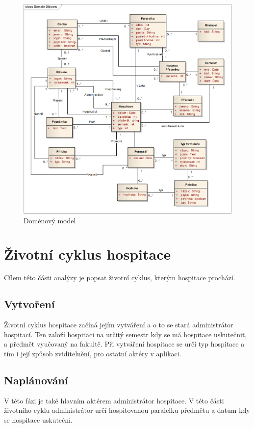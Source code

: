 \begin{figure}[p]
\begin{center}
\includegraphics[width=16cm]{figures/DomainModel}
\caption{Doménový model}
\label{fig:domainmodel}
\end{center}
\end{figure}

\section{Životní cyklus hospitace}
Cílem této části analýzy je popsat životní cyklus, kterým hospitace prochází. 

\subsection{Vytvoření}
Životní cyklus hospitace začíná jejím vytváření a o to se stará administrátor hospitací. Ten založí hospitaci na určitý semestr kdy se má hospitace uskutečnit, a předmět vyučovaný na fakultě. Při vytváření hospitace se určí typ hospitace a tím i její způsob zviditelnění, pro ostatní aktéry v aplikaci.

\subsection{Naplánování}
V této fázi je také hlavním aktérem administrátor hospitace. V této části životního cyklu administrátor určí hospitovanou paralelku předmětu a datum  kdy se hospitace uskuteční.  

